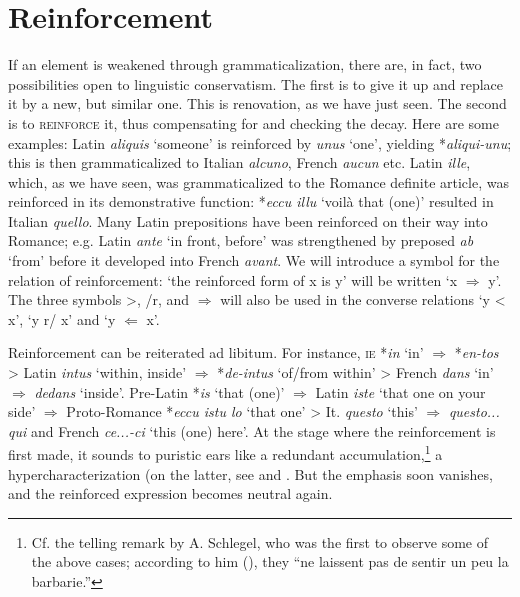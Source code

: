 \section{Reinforcement} \label{sec:2.5}

If an element is weakened through grammaticalization, there are, in fact, two possibilities open to linguistic conservatism. The first is to give it up and replace it by a new, but similar one. This is renovation, as we have just seen. The second is to \textsc{reinforce} it, thus compensating for and checking the decay. Here are some examples: Latin \textit{aliquis} ‘someone’ is reinforced by \textit{unus} ‘one’, yielding *\textit{aliqui-unu}; this is then grammaticalized to Italian \textit{alcuno}, French \textit{aucun} etc. Latin \textit{ille}, which, as we have seen, was grammaticalized to the Romance definite article, was reinforced in its demonstrative function: *\textit{eccu illu} ‘voilà that (one)’ resulted in Italian \textit{quello}. Many Latin prepositions have been reinforced on their way into Romance; e.g. Latin \textit{ante} ‘in front, before’ was strengthened by preposed \textit{ab} ‘from’ before it developed into French \textit{avant}. We will introduce a symbol for the relation of reinforcement: ‘the reinforced form of x is y’ will be written ‘x $\Rightarrow $ y’. The three symbols {\textgreater}, /r, and $\Rightarrow $ will also be used in the converse relations ‘y {\textless} x’, ‘y r/ x’ and ‘y $\Leftarrow $ x’.

Reinforcement can be reiterated ad libitum. For instance, \textsc{ie} *\textit{in} ‘in’ $\Rightarrow $ *\textit{en-tos} {\textgreater} Latin \textit{intus} ‘within, inside’ $\Rightarrow $ *\textit{de-intus} ‘of/from within’ {\textgreater} French \textit{dans} ‘in’ $\Rightarrow $ \textit{dedans} ‘inside’. Pre-Latin *\textit{is} ‘that (one)’ $\Rightarrow $ Latin \textit{iste} ‘that one on your side’ $\Rightarrow $ Proto-Romance *\textit{eccu istu lo} ‘that one’ {\textgreater} It. \textit{questo} ‘this’ $\Rightarrow $ \textit{questo... qui} and French \textit{ce...-ci} ‘this (one) here’. At the stage where the reinforcement is first made, it sounds to puristic ears like a redundant accumulation,\footnote{Cf. the telling remark by A. Schlegel, who was the first to observe some of the above cases; according to him (\citeyear[30]{Schlegel1818}), they “ne laissent pas de sentir un peu la barbarie.”} a hypercharacterization (on the latter, see \citet{Malkiel1957} and \citet[Ch.~\textsc{iv}]{Tauli1966}. But the emphasis soon vanishes, and the reinforced expression becomes neutral again.

